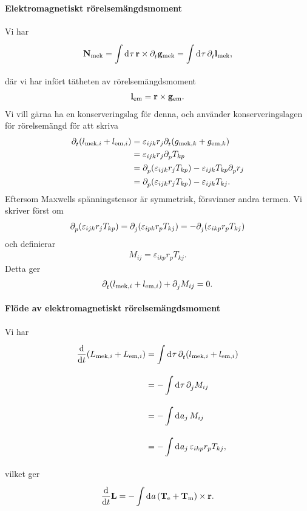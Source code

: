 \paragraph{Elektromagnetiskt rörelsemängdsmoment}
Vi har
\begin{align*}
	\vb{N}_{\text{mek}} = \int\limits_{}^{}\dd[]{\tau}\vb{r}\times\partial_{t}^{}\vb{g}_{\text{mek}} = \int\limits_{}^{}\dd[]{\tau}\partial_{t}^{}\vb{l}_{\text{mek}},
\end{align*}
där vi har infört tätheten av rörelsemängdsmoment
\begin{align*}
	\vb{l}_{\text{em}} = \vb{r}\times\vb{g}_{\text{em}}.
\end{align*}
Vi vill gärna ha en konserveringslag för denna, och använder konserveringslagen för rörelsemängd för att skriva
\begin{align*}
	\partial_{t}^{}(l_{\text{mek}, i} + l_{\text{em}, i}) &= \varepsilon_{ijk}r_{j}\partial_{t}^{}(g_{\text{mek}, k} + g_{\text{em}, k}) \\
	                                                &= \varepsilon_{ijk}r_{j}\partial_{p}^{}T_{kp} \\
	                                                &= \partial_{p}^{}(\varepsilon_{ijk}r_{j}T_{kp}) - \varepsilon_{ijk}T_{kp}\partial_{p}^{}r_{j} \\
	                                                &= \partial_{p}^{}(\varepsilon_{ijk}r_{j}T_{kp}) - \varepsilon_{ijk}T_{kj}.
\end{align*}
Eftersom Maxwells spänningstensor är symmetrisk, försvinner andra termen. Vi skriver först om
\begin{align*}
	\partial_{p}^{}(\varepsilon_{ijk}r_{j}T_{kp}) = \partial_{j}^{}(\varepsilon_{ipk}r_{p}T_{kj}) = -\partial_{j}^{}(\varepsilon_{ikp}r_{p}T_{kj})
\end{align*}
och definierar
\begin{align*}
	M_{ij} = \varepsilon_{ikp}r_{p}T_{kj}.
\end{align*}
Detta ger
\begin{align*}
	\partial_{t}^{}(l_{\text{mek}, i} + l_{\text{em}, i}) + \partial_{j}^{}M_{ij} = 0.
\end{align*}

\paragraph{Flöde av elektromagnetiskt rörelsemängdsmoment}
Vi har
\begin{align*}
	\dv{t}(L_{\text{mek}, i} + L_{\text{em}, i}) &= \int\limits_{}^{}\dd[]{\tau}\partial_{t}^{}(l_{\text{mek}, i} + l_{\text{em}, i}) \\
	                                             &= -\int\limits_{}^{}\dd[]{\tau}\partial_{j}^{}M_{ij} \\
	                                             &= -\int\limits_{}^{}\dd[]{a_{j}}M_{ij} \\
	                                             &= -\int\limits_{}^{}\dd[]{a_{j}}\varepsilon_{ikp}r_{p}T_{kj},
\end{align*}
vilket ger
\begin{align*}
	\dv{t}\vb{L} = -\int\limits_{}^{}\dd[]{a}(\vb{T}_{\text{e}} + \vb{T}_{\text{m}})\times\vb{r}.
\end{align*}